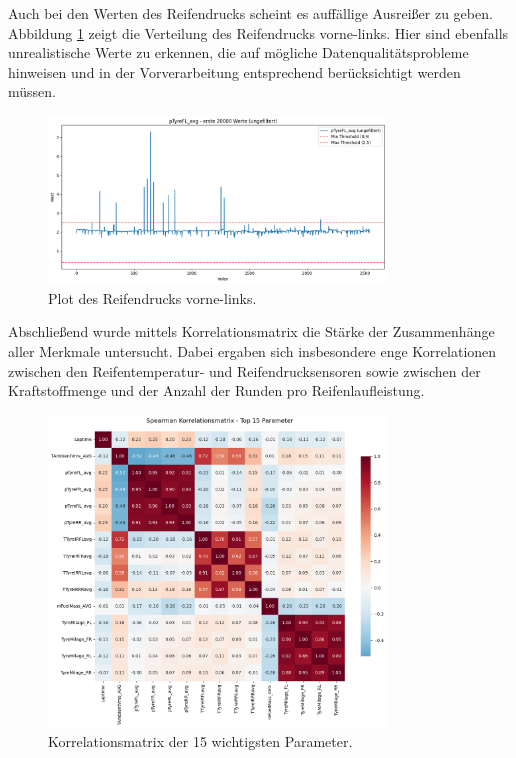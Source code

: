 Auch bei den Werten des Reifendrucks scheint es auffällige Ausreißer zu geben. Abbildung \ref{fig:druck_distribution} zeigt die Verteilung des Reifendrucks vorne-links. Hier sind ebenfalls unrealistische Werte zu erkennen, die auf mögliche Datenqualitätsprobleme hinweisen und in der Vorverarbeitung entsprechend berücksichtigt werden müssen.
\begin{figure}[H]
  \centering
  \includegraphics[width=0.8\textwidth]{graphics/DruckPlot.png}
  \caption{Plot des Reifendrucks vorne-links.}
  \label{fig:druck_distribution}
\end{figure}

Abschließend wurde mittels Korrelationsmatrix die Stärke der Zusammenhänge aller Merkmale untersucht. Dabei ergaben sich insbesondere enge Korrelationen zwischen den Reifentemperatur- und Reifendrucksensoren sowie zwischen der Kraftstoffmenge und der Anzahl der Runden pro Reifenlaufleistung. 
\begin{figure}[H]
  \centering
  \includegraphics[width=0.8\textwidth]{graphics/korrelations_matrix_top.png}
  \caption{Korrelationsmatrix der 15 wichtigsten Parameter.}
  \label{fig:korrelations_matrix}
\end{figure}


